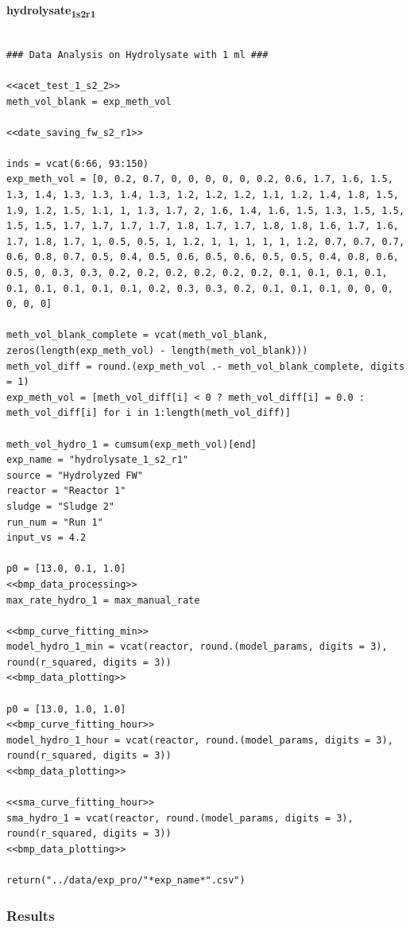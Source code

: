 \documentclass[11pt]{article}
\begin{document}
\textbf{hydrolysate\textsubscript{1}\textsubscript{s2}\textsubscript{r1}}
\begin{verbatim}

### Data Analysis on Hydrolysate with 1 ml ###

<<acet_test_1_s2_2>>
meth_vol_blank = exp_meth_vol

<<date_saving_fw_s2_r1>>

inds = vcat(6:66, 93:150)
exp_meth_vol = [0, 0.2, 0.7, 0, 0, 0, 0, 0, 0.2, 0.6, 1.7, 1.6, 1.5, 1.3, 1.4, 1.3, 1.3, 1.4, 1.3, 1.2, 1.2, 1.2, 1.1, 1.2, 1.4, 1.8, 1.5, 1.9, 1.2, 1.5, 1.1, 1, 1.3, 1.7, 2, 1.6, 1.4, 1.6, 1.5, 1.3, 1.5, 1.5, 1.5, 1.5, 1.7, 1.7, 1.7, 1.7, 1.8, 1.7, 1.7, 1.8, 1.8, 1.6, 1.7, 1.6, 1.7, 1.8, 1.7, 1, 0.5, 0.5, 1, 1.2, 1, 1, 1, 1, 1, 1.2, 0.7, 0.7, 0.7, 0.6, 0.8, 0.7, 0.5, 0.4, 0.5, 0.6, 0.5, 0.6, 0.5, 0.5, 0.4, 0.8, 0.6, 0.5, 0, 0.3, 0.3, 0.2, 0.2, 0.2, 0.2, 0.2, 0.2, 0.1, 0.1, 0.1, 0.1, 0.1, 0.1, 0.1, 0.1, 0.1, 0.2, 0.3, 0.3, 0.2, 0.1, 0.1, 0.1, 0, 0, 0, 0, 0, 0]

meth_vol_blank_complete = vcat(meth_vol_blank, zeros(length(exp_meth_vol) - length(meth_vol_blank)))
meth_vol_diff = round.(exp_meth_vol .- meth_vol_blank_complete, digits = 1)
exp_meth_vol = [meth_vol_diff[i] < 0 ? meth_vol_diff[i] = 0.0 : meth_vol_diff[i] for i in 1:length(meth_vol_diff)]

meth_vol_hydro_1 = cumsum(exp_meth_vol)[end]
exp_name = "hydrolysate_1_s2_r1"
source = "Hydrolyzed FW"
reactor = "Reactor 1"
sludge = "Sludge 2"
run_num = "Run 1"
input_vs = 4.2

p0 = [13.0, 0.1, 1.0]
<<bmp_data_processing>>
max_rate_hydro_1 = max_manual_rate

<<bmp_curve_fitting_min>>
model_hydro_1_min = vcat(reactor, round.(model_params, digits = 3), round(r_squared, digits = 3))
<<bmp_data_plotting>>

p0 = [13.0, 1.0, 1.0]
<<bmp_curve_fitting_hour>>
model_hydro_1_hour = vcat(reactor, round.(model_params, digits = 3), round(r_squared, digits = 3))
<<bmp_data_plotting>>

<<sma_curve_fitting_hour>>
sma_hydro_1 = vcat(reactor, round.(model_params, digits = 3), round(r_squared, digits = 3))
<<bmp_data_plotting>>

return("../data/exp_pro/"*exp_name*".csv")
\end{verbatim}

\subsubsection{Results}
\label{sec:orgca21562}
\end{document}
